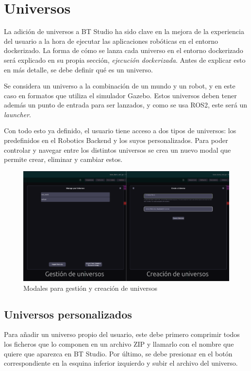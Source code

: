 \section{Universos}

La adición de universos a BT Studio ha sido clave en la mejora de la experiencia del usuario a la hora de ejecutar las aplicaciones robóticas en el entorno dockerizado. La forma de cómo se lanza cada universo en el entorno dockerizado será explicado en su propia sección, \textit{ejecución dockerizada}. Antes de explicar esto en más detalle, se debe definir qué es un universo.

Se considera un universo a la combinación de un mundo y un robot, y en este caso en formatos que utiliza el simulador Gazebo. Estos universos deben tener además un punto de entrada para ser lanzados, y como se usa ROS2, este será un \textit{launcher}.

Con todo esto ya definido, el usuario tiene acceso a dos tipos de universos: los predefinidos en el Robotics Backend y los suyos personalizados. Para poder controlar y navegar entre los distintos universos se crea un nuevo modal que permite crear, eliminar y cambiar estos.

\begin{figure}[H]
    \centering
    \includegraphics[width=\textwidth]{figures/bt-avances/bt-univ.png}
    \caption{Modales para gestión y creación de universos}
    \label{fig:bt-univ}
\end{figure}

\subsection{Universos personalizados}

Para añadir un universo propio del usuario, este debe primero comprimir todos los ficheros que lo componen en un archivo ZIP y llamarlo con el nombre que quiere que aparezca en BT Studio. Por último, se debe presionar en el botón correspondiente en la esquina inferior izquierdo y subir el archivo del universo.

